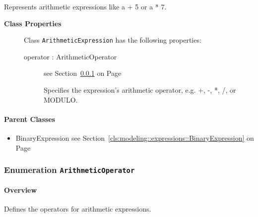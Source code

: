 	
			
Represents arithmetic expressions like a + 5 or a * 7.	
		
	


\begin{description}

	\item[\textbf{Class Properties}] Class \texttt{ArithmeticExpression} has the following properties:
	\begin{description}
\item[operator : ArithmeticOperator 	]
see Section~\ref{cls:modeling::expressions::ArithmeticOperator} on Page~\pageref{cls:modeling::expressions::ArithmeticOperator}\hspace{\fill}
\nopagebreak


	
			
Specifies the expression's arithmetic operator, e.g. +, -, *, /, or MODULO.	
		
	
	\end{description}
	
	

\end{description}

\paragraph{Parent Classes}
\begin{itemize}
\item BinaryExpression see Section~\ref{cls:modeling::expressions::BinaryExpression} on Page~\pageref{cls:modeling::expressions::BinaryExpression}\end{itemize}
\subsubsection{\Large{Enumeration \bfseries \texttt{ArithmeticOperator}\normalfont}}
\label{cls:modeling::expressions::ArithmeticOperator} 
\paragraph{Overview}
	
			
Defines the operators for arithmetic expressions.	
		
	


